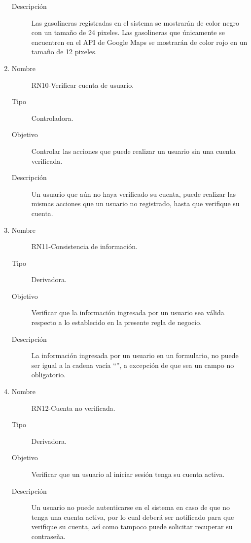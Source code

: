\begin{enumerate}[label=RN\arabic*.]
\begin{description}
			\item[Descripción] Las gasolineras registradas en el sistema se mostrarán de color negro con un tamaño de 24 pixeles. Las gasolineras que únicamente se encuentren en el API de Google Maps se mostrarán de color rojo en un tamaño de 12 pixeles.
		\end{description}
	\item \label{RN10}
		\begin{description}
			\item[Nombre] RN10-Verificar cuenta de usuario.
			\item[Tipo] Controladora.
			\item[Objetivo] Controlar las acciones que puede realizar un usuario sin una cuenta verificada.
			\item[Descripción] Un usuario que aún no haya verificado su cuenta, puede realizar las mismas acciones que un usuario no registrado, hasta que verifique su cuenta.
		\end{description}
	\item \label{RN11}
		\begin{description}
			\item[Nombre] RN11-Consistencia de información.
			\item[Tipo] Derivadora.
			\item[Objetivo] Verificar que la información ingresada por un usuario sea válida respecto a lo establecido en la presente regla de negocio.
			\item[Descripción] La información ingresada por un usuario en un formulario, no puede ser igual a la cadena vacía ``'', a excepción de que sea un campo no obligatorio.
		\end{description}
	\item \label{RN12}
		\begin{description}
			\item[Nombre] RN12-Cuenta no verificada.
			\item[Tipo] Derivadora.
			\item[Objetivo] Verificar que un usuario al iniciar sesión tenga su cuenta activa.
			\item[Descripción] Un usuario no puede autenticarse en el sistema en caso de que no tenga una cuenta activa, por lo cual deberá ser notificado para que verifique su cuenta, así como tampoco puede solicitar recuperar su contraseña.
		\end{description}
\end{enumerate}